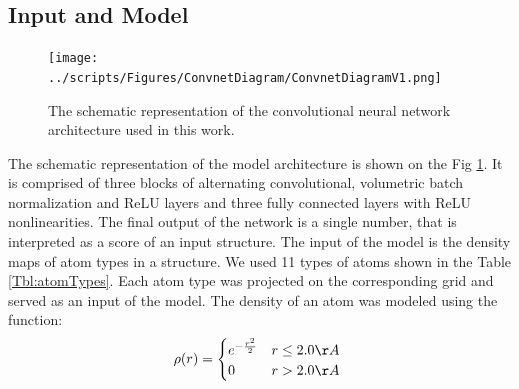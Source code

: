 \documentclass[a4paper,10pt]{article}
\begin{document}
\subsection{Input and Model}
\begin{figure}[H]
    \centering
    \texttt{[image: ../scripts/Figures/ConvnetDiagram/ConvnetDiagramV1.png]}
    \caption{The schematic representation of the convolutional neural network architecture used in this work.}
    \label{Fig:CNNModel}
\end{figure}
The schematic representation of the model architecture is shown on the Fig \ref{Fig:CNNModel}. 
It is comprised of three blocks of alternating convolutional, 
volumetric batch normalization and ReLU layers and three 
fully connected layers with ReLU nonlinearities. The final output of the network is a single number, 
that is interpreted as a score of an input structure.
The input of the model is the density maps of atom types in a structure. We used 11 types of atoms shown in the Table \ref{Tbl:atomTypes}. 
Each atom type was projected on the corresponding grid and served as an input of the model. 
The density of an atom was modeled using the function: 
$$
\rho(r) =  \begin{cases}
               e^{-\frac{r^2}{2}}&r\leq 2.0\AA~\\
               0                 &r>2.0\AA~\\
            \end{cases}
$$
\end{document}
